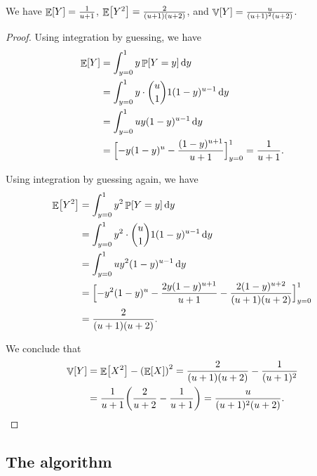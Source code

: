 \begin{lemma}
    We have $\mathop{\mathbb{E}}\!\left[ {Y} \right] = \frac{1}{u+1}$,
    $\mathop{\mathbb{E}}\!\left[ {Y^2} \right] = \frac{2}{(u+1)(u+2)}$, and
    $\mathop{\mathbb{V}}\!\left[ {Y} \right]=\frac{u}{(u+1)^2 (u+2)}$.
\end{lemma}
\begin{proof}
    Using integration by guessing, we have
    \begin{align*}
      \Ex{Y}%
      &=%
        \int_{y=0}^1 y \Prob{Y=y} \diffX{y}%
      \\&=%
        \int_{y=0}^1 y \cdot \binom{u}{1} 1  (1-y)^{u-1} \diffX{y}%
      \\&=%
        \int_{y=0}^{1} u y (1-y)^{u-1} \diffX{y}%
      \\&%
      =%
      \Bigl[ -y(1-y)^{u} - \frac{(1-y)^{u+1}}{u+1} \Bigr]_{y=0}^{1}%
      =%
      \frac{1}{u+1}.
    \end{align*}

    Using integration by guessing again, we have
    \begin{align*}
      \Ex{Y^2}%
      &=%
        \int_{y=0}^1 y^2 \Prob{Y=y} \diffX{y}%
      \\&=%
        \int_{y=0}^1 y^2 \cdot \binom{u}{1} 1  (1-y)^{u-1} \diffX{y}%
      \\&=%
        \int_{y=0}^{1} u y^2 (1-y)^{u-1} \diffX{y}%
      \\&%
      =%
      \Bigl[
      -y^2(1-y)^{u} - \frac{2y(1-y)^{u+1}}{u+1}
      - \frac{2(1-y)^{u+2}}{(u+1)(u+2)}
      \Bigr]_{y=0}^{1}%
      \\&=%
      \frac{2}{(u+1)(u+2)}.
    \end{align*}
    
    We conclude that
    \begin{align*}
        \Var{Y}%
        &=%
        \Ex{X^2} -\pth{\Ex{X}}^2%
        =%
        \frac{2}{(u+1)(u+2)} -
        \frac{1}{(u+1)^2} 
        \\&=%
        \frac{1}{u+1} \pth{ \frac{2}{u+2} - \frac{1}{u+1}}
        =%
        \frac{u}{(u+1)^2 (u+2)}.        
    \end{align*}
\end{proof}


\subsection{The algorithm}

